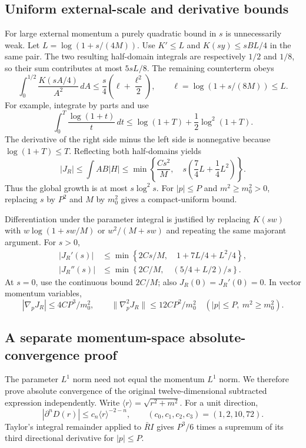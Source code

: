 \subsection{Uniform external-scale and derivative bounds}
For large external momentum a purely quadratic bound in \(s\) is unnecessarily
weak. Let \(L=\log(1+s/(4M))\). Use \(K'\leq L\) and
\(K(sy)\leq sBL/4\) in the same pair. The two resulting half-domain integrals
are respectively \(1/2\) and \(1/8\), so their sum contributes at most
\(5sL/8\). The remaining counterterm obeys
\[
 \int_0^{1/2}\frac{K(sA/4)}{A^2}\,dA
 \leq\frac s4\left(\ell+\frac{\ell^2}{2}\right),\qquad
 \ell=\log(1+s/(8M))\leq L.
\]
For example, integrate by parts and use
\[
 \int_0^T\frac{\log(1+t)}t\,dt
 \leq\log(1+T)+\frac12\log^2(1+T).
\]
The derivative of the right side minus the left side is nonnegative because
\(\log(1+T)\leq T\). Reflecting both half-domains yields
\begin{equation}\label{eq:global-bound}
 |J_R|\leq\int AB|H|
 \leq\min\left\{\frac{Cs^2}{M},\quad
          s\left(\frac74L+\frac14L^2\right)\right\}.
\end{equation}
Thus the global growth is at most \(s\log^2s\). For \(|p|\leq P\) and
\(m^2\geq m_0^2>0\), replacing \(s\) by \(P^2\) and \(M\) by \(m_0^2\)
gives a compact-uniform bound.

Differentiation under the parameter integral is justified by replacing
\(K(sw)\) with \(w\log(1+sw/M)\) or \(w^2/(M+sw)\) and repeating the
same majorant argument. For \(s>0\),
\begin{align}
 |J_R'(s)|&\leq\min\left\{2Cs/M,\quad1+7L/4+L^2/4\right\},\\
 |J_R''(s)|&\leq\min\left\{2C/M,\quad(5/4+L/2)/s\right\}.
\end{align}
At \(s=0\), use the continuous bound \(2C/M\); also
\(J_R(0)=J_R'(0)=0\). In vector momentum variables,
\[
 |\nabla_p J_R|\leq4CP^3/m_0^2,\qquad
 \|\nabla_p^2J_R\|\leq12CP^2/m_0^2
 \quad (|p|\leq P,\ m^2\geq m_0^2).
\]

\subsection{A separate momentum-space absolute-convergence proof}
The parameter \(L^1\) norm need not equal the momentum \(L^1\) norm.
We therefore prove absolute convergence of the original twelve-dimensional
subtracted expression independently. Write
\(\langle r\rangle=\sqrt{r^2+m^2}\). For a unit direction,
\[
 |\partial^nD(r)|\leq c_n\langle r\rangle^{-2-n},\qquad
 (c_0,c_1,c_2,c_3)=(1,2,10,72).
\]
Taylor's integral remainder applied to \(\bar R I\) gives \(P^3/6\) times
a supremum of its third directional derivative for \(|p|\leq P\).

